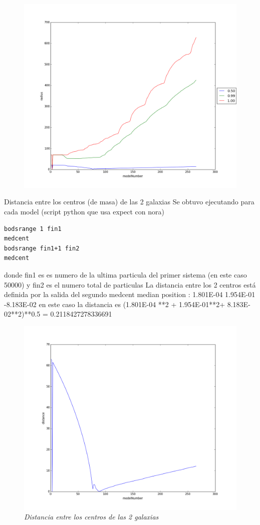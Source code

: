 \documentclass[12pt]{book}
\begin{document}
\begin{itemize}
\begin{figure}[!h]
 \centering
 \includegraphics[scale=0.4]{imgRadcon2.png}
 \caption{\emph{}}
 \label{Fig: 2}
\end{figure}

Distancia entre los centros (de masa) de las 2 galaxias
Se obtuvo ejecutando para cada model (script python que usa expect con nora)
\begin{verbatim}
bodsrange 1 fin1
medcent
bodsrange fin1+1 fin2
medcent
\end{verbatim}
donde fin1 es es numero de la ultima particula del primer sistema (en este caso 50000) y fin2 es el numero total de particulas
La distancia entre los 2 centros está definida por la salida del segundo medcent 
median position :    1.801E-04   1.954E-01  -8.183E-02
en este caso la distancia es  (1.801E-04 **2 +  1.954E-01**2+  8.183E-02**2)**0.5 = 0.2118427278336691

\begin{figure}[!h]
 \centering
 \includegraphics[scale=0.4]{imgDistcon.png}
 \caption{\emph{Distancia entre los centros de las 2 galaxias}}
 \label{Fig: 3}
\end{figure}


\end{itemize}
\end{document}
